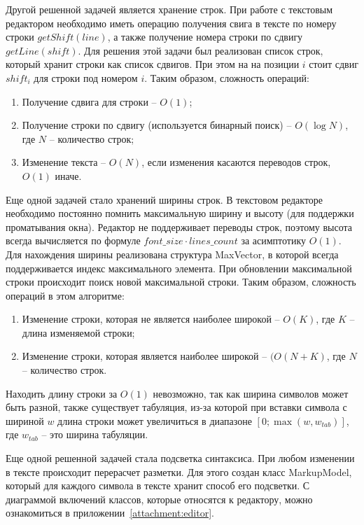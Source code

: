 \documentclass[explnote]{espd}
\begin{document}
Другой решенной задачей является хранение строк. При работе с текстовым редактором необходимо иметь операцию получения свига в тексте по номеру строки $getShift(line)$, а также получение номера строки по сдвигу $getLine(shift)$. Для решения этой задачи был реализован список строк, который хранит строки как список сдвигов. При этом на на позиции $i$ стоит сдвиг $shift_i$ для строки под номером $i$. Таким образом, сложность операций:

\begin{enumerate}
\item Получение сдвига для строки -- $O(1)$;
\item Получение строки по сдвигу (используется бинарный поиск) -- $O(\log N)$, где $N$ -- количество строк;
\item Изменение текста -- $O(N)$, если изменения касаются переводов строк, $O(1)$ иначе.
\end{enumerate}

Еще одной задачей стало хранений ширины строк. В текстовом редакторе необходимо постоянно помнить максимальную ширину и высоту (для поддержки проматывания окна). Редактор не поддерживает переводы строк, поэтому высота всегда вычисляется по формуле $font\_size \cdot lines\_count$ за асимптотику $O(1)$. Для нахождения ширины реализована структура MaxVector, в которой всегда поддерживается индекс максимального элемента. При обновлении максимальной строки происходит поиск новой максимальной строки. Таким образом, сложность операций в этом алгоритме:

\begin{enumerate}
\item Изменение строки, которая не является наиболее широкой -- $O(K)$, где $K$ -- длина изменяемой строки;
\item Изменение строки, которая является наиболее широкой -- $(O(N + K)$, где $N$ -- количество строк.
\end{enumerate} 

Находить длину строки за $O(1)$ невозможно, так как ширина символов может быть разной, также существует табуляция, из-за которой при вставки символа с шириной $w$ длина строки может увеличиться в диапазоне $[0; \max(w, w_{tab})]$, где $w_{tab}$ -- это ширина табуляции.

Еще одной решенной задачей стала подсветка синтаксиса. При любом изменении в тексте происходит перерасчет разметки. Для этого создан класс MarkupModel, который для каждого символа в тексте хранит способ его подсветки. С диаграммой включений классов, которые относятся к редактору, можно ознакомиться в приложении~\ref{attachment:editor}.
\end{document}
